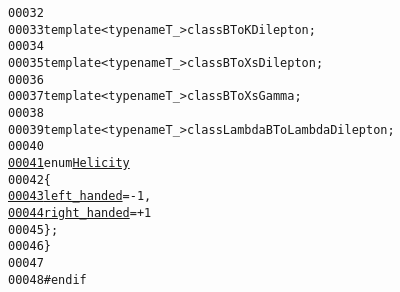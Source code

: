 \begin{footnotesize}
\begin{alltt}
00032 
00033     \textcolor{keyword}{template} <\textcolor{keyword}{typename} T\_> \textcolor{keyword}{class }BToKDilepton;
00034 
00035     \textcolor{keyword}{template} <\textcolor{keyword}{typename} T\_> \textcolor{keyword}{class }BToXsDilepton;
00036 
00037     \textcolor{keyword}{template} <\textcolor{keyword}{typename} T\_> \textcolor{keyword}{class }BToXsGamma;
00038 
00039     \textcolor{keyword}{template} <\textcolor{keyword}{typename} T\_> \textcolor{keyword}{class }LambdaBToLambdaDilepton;
00040 
\hypertarget{decays_8hh_source_l00041}{}\hyperlink{namespaceeos_a4b2f8b0a4184d635cfc47c4ee234aea5}{00041}     \textcolor{keyword}{enum} \hyperlink{namespaceeos_a4b2f8b0a4184d635cfc47c4ee234aea5}{Helicity}
00042     \{
\hypertarget{decays_8hh_source_l00043}{}\hyperlink{namespaceeos_a4b2f8b0a4184d635cfc47c4ee234aea5a01df88b4e8525e89646a0bd5d0fdbd01}{00043}         \hyperlink{namespaceeos_a4b2f8b0a4184d635cfc47c4ee234aea5a01df88b4e8525e89646a0bd5d0fdbd01}{left_handed} = -1,
\hypertarget{decays_8hh_source_l00044}{}\hyperlink{namespaceeos_a4b2f8b0a4184d635cfc47c4ee234aea5ae7094996100231c5a5583bb323488b18}{00044}         \hyperlink{namespaceeos_a4b2f8b0a4184d635cfc47c4ee234aea5ae7094996100231c5a5583bb323488b18}{right_handed} = +1
00045     \};
00046 \}
00047 
00048 \textcolor{preprocessor}{#endif}
\end{alltt}\end{footnotesize}
